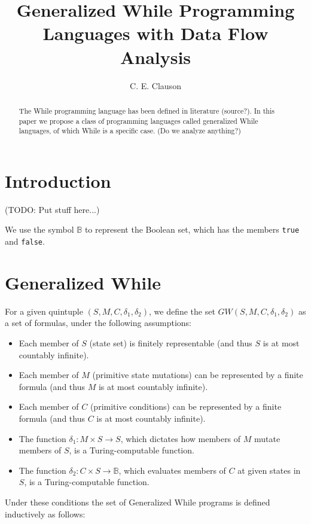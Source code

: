 \documentclass[11pt]{article}
\begin{document}
\title{Generalized While Programming Languages with Data Flow Analysis}
\author{C. E. Clauson}
\maketitle

\begin{abstract}
The While programming language has been defined in literature (source?).  In this paper we propose a class of programming languages called generalized While languages, of which While is a specific case.  (Do we analyze anything?)
\end{abstract}

\section{Introduction}
(TODO: Put stuff here...)

We use the symbol $\mathbb{B}$ to represent the Boolean set, which has the members \texttt{true} and \texttt{false}.

\section{Generalized While}
For a given quintuple $(S, M, C, \delta_{1}, \delta_{2})$, we define the set $GW(S, M, C, \delta_{1}, \delta_{2})$ as a set of formulas, under the following assumptions:

\begin{itemize}
\item Each member of $S$ (state set) is finitely representable (and thus $S$ is at most countably infinite).
\item Each member of $M$ (primitive state mutations) can be represented by a finite formula (and thus $M$ is at most countably infinite).
\item Each member of $C$ (primitive conditions) can be represented by a finite formula (and thus $C$ is at most countably infinite).
\item The function $\delta_{1} : M \times S \rightarrow S$, which dictates how members of $M$ mutate members of $S$, is a Turing-computable function. 
\item The function $\delta_{2} : C \times S \rightarrow \mathbb{B}$, which evaluates members of $C$ at given states in $S$, is a Turing-computable function.
\end{itemize}

Under these conditions the set of Generalized While programs is defined inductively as follows:
\end{document}
